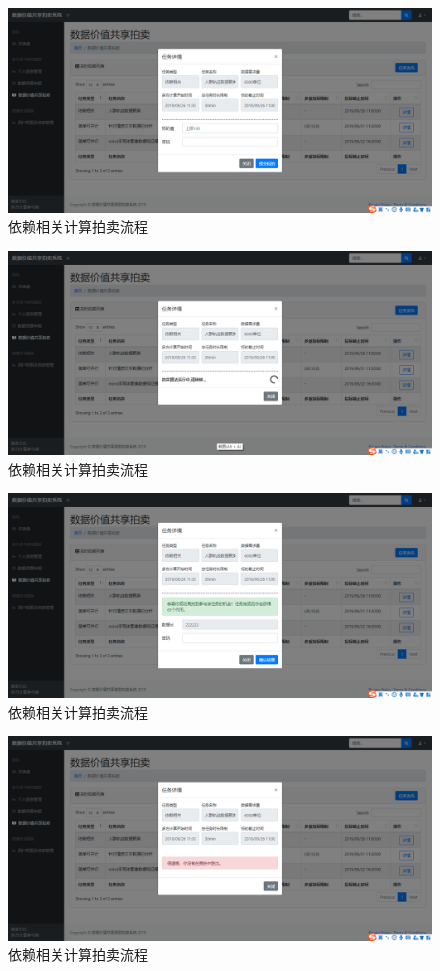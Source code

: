\documentclass[promaster]{thesis-uestc}
\begin{document}
\begin{figure}[H]
    \includegraphics[width=400pt]{ui/paimaitoubiao.png}
    \caption{依赖相关计算拍卖流程}
\end{figure}
\begin{figure}[H]
    \includegraphics[width=400pt]{ui/paimaiyunxing.png}
    \caption{依赖相关计算拍卖流程}
\end{figure}
\begin{figure}[H]
    \includegraphics[width=400pt]{ui/paimaichenggong.png}
    \caption{依赖相关计算拍卖流程}
\end{figure}
\begin{figure}[H]
    \includegraphics[width=400pt]{ui/paimaishibai.png}
    \caption{依赖相关计算拍卖流程}
\end{figure}
\end{document}
